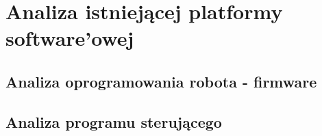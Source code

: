 \section{Analiza istniejącej platformy software'owej}
\subsection{Analiza oprogramowania robota - firmware}
\subsection{Analiza programu sterującego}